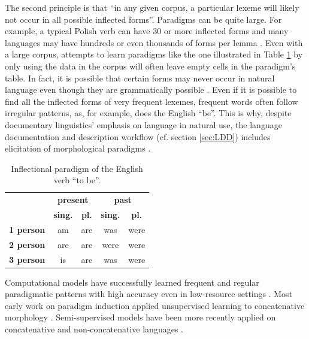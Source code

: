 The second principle is that ``in any given corpus, a particular lexeme will likely not occur in all possible inflected forms''.  
Paradigms can be quite large. For example, a typical Polish verb can have 30 or more inflected forms and many languages may have hundreds or even thousands of forms per lemma \citep{corbett_unique_2013}. Even with a large corpus, attempts to learn paradigms like the one illustrated in Table \ref{tab:EngParadigm} by only using the data in the corpus will often leave empty cells in the paradigm's table. In fact, it is possible that certain forms may never occur in natural language even though they are grammatically possible \citep{silfverberg_encoder-decoder_2018}. Even if it is possible to find all the inflected forms of very frequent lexemes, frequent words often follow irregular patterns, as, for example, does the English ``be''. This is why, despite documentary linguistics' emphasis on language in natural use, the language documentation and description workflow (cf. section \ref{sec:LDD}) includes elicitation of morphological paradigms \citep{lupke_data_2010,boerger_language_2016}. 

\begin{table}[tb]
    \begin{center}
    \begin{tabular}{l|c|c|c|c}
      & \multicolumn{2}{c}{\textbf{present}} & \multicolumn{2}{|c}{\textbf{past}} \\
      \cline{2-5}
       & \textbf{sing.}  & \textbf{pl.} & \textbf{sing.}  & \textbf{pl.} \\
       \hline
      \textbf{1 person}  & am & are & was & were \\
      \textbf{2 person} & are & are  & were & were  \\
      \textbf{3 person} & is & are & was & were \\
    \end{tabular}
    \caption[Inflectional paradigm of the English verb ``be'']{Inflectional paradigm of the English verb ``to be''. 
    }
    \label{tab:EngParadigm}
    \end{center}
\end{table}


Computational models have successfully learned frequent and regular paradigmatic patterns with high accuracy even in low-resource settings \citep{hammarstrom_unsupervised_2011,durrett-denero-2013-supervised,ahlberg_semi-supervised_2014}. Most early work on paradigm induction applied unsupervised learning to concatenative morphology \citep{goldsmith_unsupervised_2001,chan_learning_2006,monson_paramorfinding_2007b}. Semi-supervised models have been more recently applied on concatenative and non-concatenative languages \citep{dreyer_discovering_2011,durrett-denero-2013-supervised}. 

